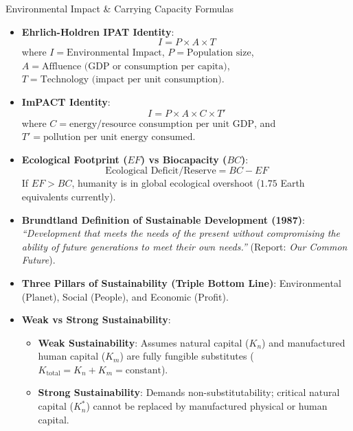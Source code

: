 \begin{formulabox}{Environmental Impact \& Carrying Capacity Formulas}
\begin{itemize}[leftmargin=1.2em]
    \item \textbf{Ehrlich-Holdren IPAT Identity}:
    \begin{equation}
    I = P \times A \times T
    \end{equation}
    where $I = \text{Environmental Impact}$, $P = \text{Population size}$, $A = \text{Affluence (GDP or consumption per capita)}$, $T = \text{Technology (impact per unit consumption)}$.
    \item \textbf{ImPACT Identity}:
    \begin{equation}
    I = P \times A \times C \times T'
    \end{equation}
    where $C = \text{energy/resource consumption per unit GDP}$, and $T' = \text{pollution per unit energy consumed}$.
    \item \textbf{Ecological Footprint ($EF$) vs Biocapacity ($BC$)}:
    \begin{equation}
    \text{Ecological Deficit/Reserve} = BC - EF
    \end{equation}
    If $EF > BC$, humanity is in global ecological overshoot ($1.75$ Earth equivalents currently).
    \item \textbf{Brundtland Definition of Sustainable Development (1987)}:
    \textit{``Development that meets the needs of the present without compromising the ability of future generations to meet their own needs.''} (Report: \textit{Our Common Future}).
    \item \textbf{Three Pillars of Sustainability (Triple Bottom Line)}: Environmental (Planet), Social (People), and Economic (Profit).
    \item \textbf{Weak vs Strong Sustainability}:
    \begin{itemize}
        \item \textbf{Weak Sustainability}: Assumes natural capital ($K_n$) and manufactured human capital ($K_m$) are fully fungible substitutes ($K_{\text{total}} = K_n + K_m = \text{constant}$).
        \item \textbf{Strong Sustainability}: Demands non-substitutability; critical natural capital ($K_n^*$) cannot be replaced by manufactured physical or human capital.
    \end{itemize}
\end{itemize}
\end{formulabox}


